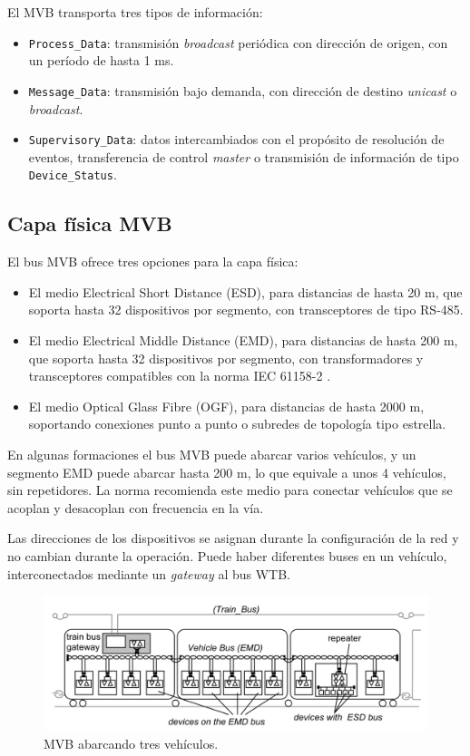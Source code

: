 El MVB transporta tres tipos de información:

\begin{itemize}
\item \texttt{Process\_Data}: transmisión \textit{broadcast} periódica con dirección de origen, con un período de hasta 1 ms.
\item \texttt{Message\_Data}: transmisión bajo demanda, con dirección de destino \textit{unicast} o \textit{broadcast}.
\item \texttt{Supervisory\_Data}: datos intercambiados con el propósito de resolución de eventos, transferencia de control \textit{master} o transmisión de información de tipo \texttt{Device\_Status}.
\end{itemize}

\subsection{Capa física MVB}

El bus MVB ofrece tres opciones para la capa física:

\begin{itemize}
\item El medio Electrical Short Distance (ESD), para distancias de hasta 20 m, que soporta hasta 32 dispositivos por segmento, con transceptores de tipo RS-485.
\item El medio Electrical Middle Distance (EMD), para distancias de hasta 200 m, que soporta hasta  32 dispositivos por segmento, con transformadores y transceptores compatibles con la norma IEC 61158-2 \cite{iec61158_2}.
\item El medio Optical Glass Fibre (OGF), para distancias de hasta 2000 m, soportando conexiones punto a punto o subredes de topología tipo estrella.
\end{itemize}

En algunas formaciones el bus MVB puede abarcar varios vehículos, y un segmento EMD puede abarcar hasta 200 m, lo que equivale a unos 4 vehículos, sin repetidores. La norma recomienda este medio para conectar vehículos que se acoplan y desacoplan con frecuencia en la vía.

Las direcciones de los dispositivos se asignan durante la configuración de la red y no cambian durante la operación. Puede haber diferentes buses en un vehículo, interconectados mediante un \textit{gateway} al bus WTB.

\begin{figure}[htbp]
	\centering
	\includegraphics[width=1\textwidth]{./Figures/tcn-emd-esd-wtb.png}
	\caption[MVB abarcando tres vehículos]{MVB abarcando tres vehículos.
        \\ }
\end{figure}

